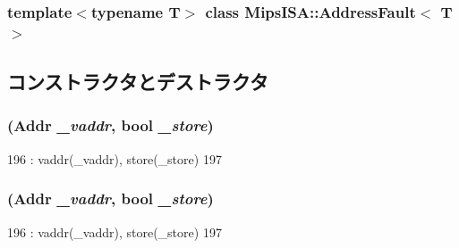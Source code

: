 \subsubsection*{template$<$typename T$>$ class MipsISA::AddressFault$<$ T $>$}



\subsection{コンストラクタとデストラクタ}
\hypertarget{classMipsISA_1_1AddressFault_a41d5cd77142b61159baea077490c4101}{
\subsubsection[{AddressFault}]{ ({\bf Addr} {\em \_\-vaddr}, \/  bool {\em \_\-store})}}
\label{classMipsISA_1_1AddressFault_a41d5cd77142b61159baea077490c4101}



\begin{DoxyCode}
196                                            : vaddr(_vaddr), store(_store)
197     {}
\end{DoxyCode}
\hypertarget{classMipsISA_1_1AddressFault_a41d5cd77142b61159baea077490c4101}{
\subsubsection[{AddressFault}]{ ({\bf Addr} {\em \_\-vaddr}, \/  bool {\em \_\-store})}}
\label{classMipsISA_1_1AddressFault_a41d5cd77142b61159baea077490c4101}



\begin{DoxyCode}
196                                            : vaddr(_vaddr), store(_store)
197     {}
\end{DoxyCode}



